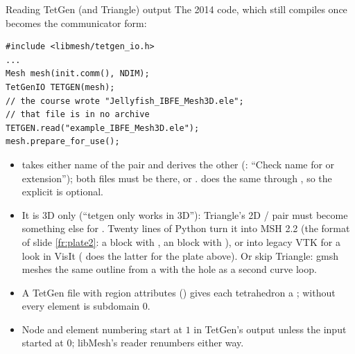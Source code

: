\documentclass[aspectratio=169,11pt]{beamer}
\begin{document}
\begin{frame}[fragile]{Reading TetGen (and Triangle) output}
\label{fr:readtetgen}
\footnotesize
\scriptsize The 2014 code, which still compiles once  becomes the communicator form:
\begin{lstlisting}[style=cpptiny]
#include <libmesh/tetgen_io.h>
...
Mesh mesh(init.comm(), NDIM);
TetGenIO TETGEN(mesh);
// the course wrote "Jellyfish_IBFE_Mesh3D.ele";
// that file is in no archive
TETGEN.read("example_IBFE_Mesh3D.ele");
mesh.prepare_for_use();
\end{lstlisting}
\begin{itemize}
  \item {} takes either name of the pair and derives the other (: ``Check name for  or  extension''); both files must be there, or .  does the same through , so the explicit  is optional.
  \item It is 3D only (``tetgen only works in 3D''): Triangle's 2D / pair must become something else for . Twenty lines of Python turn it into MSH 2.2 (the format of slide \ref{fr:plate2}: a  block with , an  block with ), or into legacy VTK for a look in VisIt ( does the latter for the plate above). Or skip Triangle: gmsh meshes the same outline from a  with the hole as a second curve loop.
  \item A TetGen  file with region attributes () gives each tetrahedron a ; without  every element is subdomain $0$.
  \item Node and element numbering start at $1$ in TetGen's output unless the input started at $0$; libMesh's reader renumbers either way.
\end{itemize}
\end{frame}
\end{document}
